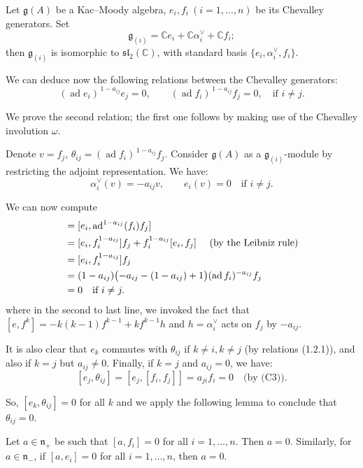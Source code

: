 \documentclass[12pt]{article}
\begin{document}
\begin{example}
Let $\mathfrak{g}(A)$ be a Kac--Moody algebra, $e_i, f_i \ (i=1,\dots,n)$ be
its Chevalley generators. Set 
\[
  \mathfrak{g}_{(i)} = \mathbb{C}e_i + \mathbb{C}\alpha_i^\vee + \mathbb{C}f_i;
\]
then $\mathfrak{g}_{(i)}$ is isomorphic to $\mathfrak{sl}_2(\mathbb{C})$, with standard basis 
$\{e_i, \alpha_i^\vee, f_i\}$.

We can deduce now the following relations between the Chevalley generators:
\begin{equation}\label{eq:Serre}
   (\operatorname{ad} e_i)^{\,1-a_{ij}} e_j = 0, 
   \qquad
   (\operatorname{ad} f_i)^{\,1-a_{ij}} f_j = 0, 
   \quad \text{if } i \neq j.
\end{equation}

We prove the second relation; the first one follows by making use of the 
Chevalley involution $\omega$.

Denote $v = f_j$, $\theta_{ij} = (\operatorname{ad} f_i)^{\,1-a_{ij}} f_j$.  
Consider $\mathfrak{g}(A)$ as a $\mathfrak{g}_{(i)}$-module by restricting the adjoint representation. We have:
\[
  \alpha_i^\vee(v) = -a_{ij} v, 
  \qquad
  e_i(v) = 0 \quad \text{if } i \neq j.
\]

We can now compute \begin{align*}
    [e_i, \theta_{ij}] & = [e_i, \ad^{1-a_{ij}}(f_i) f_j] \\
    &= [e_i, f_i^{1-a_{ij}}] f_j + f_i^{1-a_{ij}} [e_i, f_j] \texty{ (by the Leibniz rule)} \\
    &= [e_i, f_i^{1-a_{ij}}] f_j \\
    &= (1-a_{ij})\bigl(-a_{ij} - (1-a_{ij})+1 \bigr)(\operatorname{ad} f_i)^{-a_{ij}} f_j\\
    &= 0 \quad \text{if } i \neq j.
\end{align*}
where in the second to last line, we invoked the fact that $[e,f^k] = -k(k-1) f^{k-1} + k f^{k-1} h$ and $h = \alpha_i^\vee$ acts on $f_j$ by $-a_{ij}$.

It is also clear that $e_k$ commutes with $\theta_{ij}$ if $k \neq i, k \neq j$
(by relations (1.2.1)), and also if $k=j$ but $a_{ij} \neq 0$. Finally, if $k=j$ and $a_{ij}=0$, we have:
\[
   [e_j, \theta_{ij}] = [e_j, [f_i,f_j]] = a_{ji} f_i = 0 
   \quad \text{(by (C3))}.
\]

So, $[e_k, \theta_{ij}] = 0$ for all $k$ and we apply the following lemma to conclude that $\theta_{ij} = 0$.
\end{example}
\begin{lemma}
Let $a \in \mathfrak{n}_+$ be such that $[a,f_i] = 0$ for all $i=1,\dots,n$. 
Then $a=0$. Similarly, for $a \in \mathfrak{n}_-$, if $[a,e_i] = 0$ for all 
$i=1,\dots,n$, then $a=0$.
\end{lemma}
\end{document}

